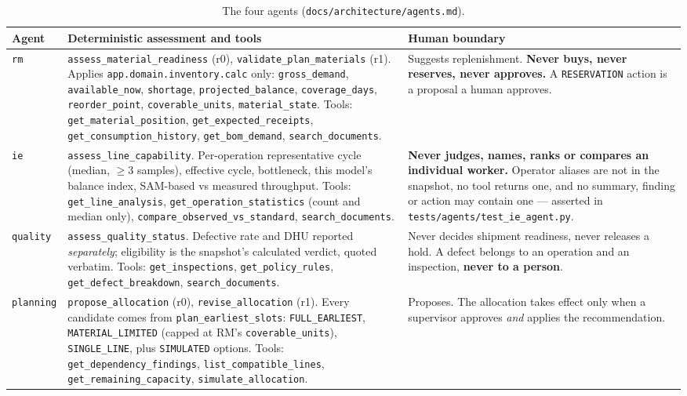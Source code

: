 \documentclass[11pt,a4paper]{article}
\begin{document}
\begin{table}[h]
\centering\small
\caption{The four agents (\texttt{docs/architecture/agents.md}).}
\begin{tabularx}{\linewidth}{@{}L{1.5cm}YL{4.1cm}@{}}
\toprule
\textbf{Agent} & \textbf{Deterministic assessment and tools} & \textbf{Human boundary}\\
\midrule
\texttt{rm} &
\texttt{assess\_material\_readiness} (r0), \texttt{validate\_plan\_materials} (r1).
Applies \texttt{app.domain.inventory.calc} only: \texttt{gross\_demand},
\texttt{available\_now}, \texttt{shortage}, \texttt{projected\_balance},
\texttt{coverage\_days}, \texttt{reorder\_point}, \texttt{coverable\_units},
\texttt{material\_state}. Tools: \texttt{get\_material\_position},
\texttt{get\_expected\_receipts}, \texttt{get\_consumption\_history},
\texttt{get\_bom\_demand}, \texttt{search\_documents}. &
Suggests replenishment. \textbf{Never buys, never reserves, never approves.} A
\texttt{RESERVATION} action is a proposal a human approves.\\
\addlinespace
\texttt{ie} &
\texttt{assess\_line\_capability}. Per-operation representative cycle (median,
$\ge 3$ samples), effective cycle, bottleneck, this model's balance index,
SAM-based vs measured throughput. Tools: \texttt{get\_line\_analysis},
\texttt{get\_operation\_statistics} (count and median only),
\texttt{compare\_observed\_vs\_standard}, \texttt{search\_documents}. &
\textbf{Never judges, names, ranks or compares an individual worker.} Operator
aliases are not in the snapshot, no tool returns one, and no summary, finding or
action may contain one --- asserted in \texttt{tests/agents/test\_ie\_agent.py}.\\
\addlinespace
\texttt{quality} &
\texttt{assess\_quality\_status}. Defective rate and DHU reported
\emph{separately}; eligibility is the snapshot's calculated verdict, quoted
verbatim. Tools: \texttt{get\_inspections}, \texttt{get\_policy\_rules},
\texttt{get\_defect\_breakdown}, \texttt{search\_documents}. &
Never decides shipment readiness, never releases a hold. A defect belongs to an
operation and an inspection, \textbf{never to a person}.\\
\addlinespace
\texttt{planning} &
\texttt{propose\_allocation} (r0), \texttt{revise\_allocation} (r1). Every
candidate comes from \texttt{plan\_earliest\_slots}: \texttt{FULL\_EARLIEST},
\texttt{MATERIAL\_LIMITED} (capped at RM's \texttt{coverable\_units}),
\texttt{SINGLE\_LINE}, plus \texttt{SIMULATED} options. Tools:
\texttt{get\_dependency\_findings}, \texttt{list\_compatible\_lines},
\texttt{get\_remaining\_capacity}, \texttt{simulate\_allocation}. &
Proposes. The allocation takes effect only when a supervisor approves
\emph{and} applies the recommendation.\\
\bottomrule
\end{tabularx}
\end{table}
\end{document}

